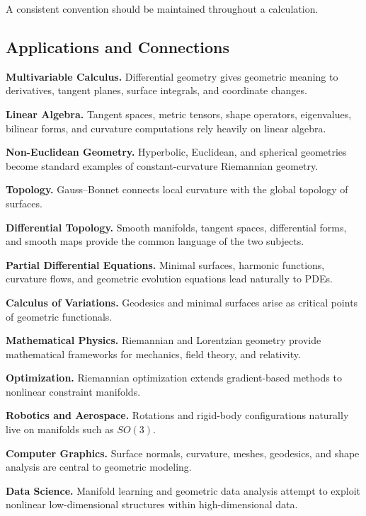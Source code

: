 A consistent convention should be maintained throughout a calculation.

\subsection{Applications and Connections}
\label{subsec:differential-geometry-applications}

\begin{applicationbox}
\textbf{Multivariable Calculus.}
Differential geometry gives geometric meaning to derivatives, tangent
planes, surface integrals, and coordinate changes.

\medskip

\textbf{Linear Algebra.}
Tangent spaces, metric tensors, shape operators, eigenvalues, bilinear forms,
and curvature computations rely heavily on linear algebra.

\medskip

\textbf{Non-Euclidean Geometry.}
Hyperbolic, Euclidean, and spherical geometries become standard examples of
constant-curvature Riemannian geometry.

\medskip

\textbf{Topology.}
Gauss--Bonnet connects local curvature with the global topology of surfaces.

\medskip

\textbf{Differential Topology.}
Smooth manifolds, tangent spaces, differential forms, and smooth maps provide
the common language of the two subjects.

\medskip

\textbf{Partial Differential Equations.}
Minimal surfaces, harmonic functions, curvature flows, and geometric
evolution equations lead naturally to PDEs.

\medskip

\textbf{Calculus of Variations.}
Geodesics and minimal surfaces arise as critical points of geometric
functionals.

\medskip

\textbf{Mathematical Physics.}
Riemannian and Lorentzian geometry provide mathematical frameworks for
mechanics, field theory, and relativity.

\medskip

\textbf{Optimization.}
Riemannian optimization extends gradient-based methods to nonlinear
constraint manifolds.

\medskip

\textbf{Robotics and Aerospace.}
Rotations and rigid-body configurations naturally live on manifolds such as
\(SO(3)\).

\medskip

\textbf{Computer Graphics.}
Surface normals, curvature, meshes, geodesics, and shape analysis are central
to geometric modeling.

\medskip

\textbf{Data Science.}
Manifold learning and geometric data analysis attempt to exploit nonlinear
low-dimensional structures within high-dimensional data.
\end{applicationbox}

